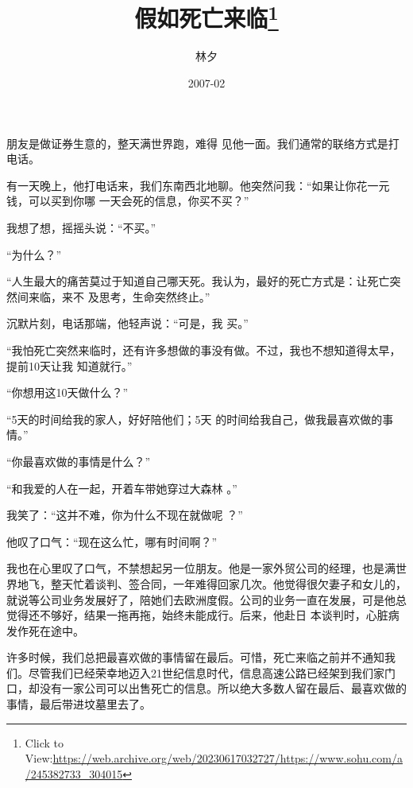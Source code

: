 \documentclass{article}
\title{假如死亡来临\footnote{Click to View:\url{https://web.archive.org/web/20230617032727/https://www.sohu.com/a/245382733_304015}}}
\author{林夕}
\date{2007-02}
\begin{document}

\maketitle


\Large

﻿朋友是做证券生意的，整天满世界跑，难得
见他一面。我们通常的联络方式是打电话。 

有一天晚上，他打电话来，我们东南西北地聊。他突然问我：“如果让你花一元钱，可以买到你哪
一天会死的信息，你买不买？” 


我想了想，摇摇头说：“不买。” 


“为什么？” 

“人生最大的痛苦莫过于知道自己哪天死。我认为，最好的死亡方式是：让死亡突然间来临，来不
及思考，生命突然终止。” 

\newpage

沉默片刻，电话那端，他轻声说：“可是，我
买。” 


“我怕死亡突然来临时，还有许多想做的事没有做。不过，我也不想知道得太早，提前10天让我
知道就行。” 


“你想用这10天做什么？” 

“5天的时间给我的家人，好好陪他们；5天
的时间给我自己，做我最喜欢做的事情。” 


“你最喜欢做的事情是什么？” 

“和我爱的人在一起，开着车带她穿过大森林
。” 

我笑了：“这并不难，你为什么不现在就做呢
？” 

\newpage

他叹了口气：“现在这么忙，哪有时间啊？”
 

我也在心里叹了口气，不禁想起另一位朋友。他是一家外贸公司的经理，也是满世界地飞，整天忙着谈判、签合同，一年难得回家几次。他觉得很欠妻子和女儿的，就说等公司业务发展好了，陪她们去欧洲度假。公司的业务一直在发展，可是他总觉得还不够好，结果一拖再拖，始终未能成行。后来，他赴日
本谈判时，心脏病发作死在途中。 

许多时候，我们总把最喜欢做的事情留在最后。可惜，死亡来临之前并不通知我们。尽管我们已经荣幸地迈入21世纪信息时代，信息高速公路已经架到我们家门口，却没有一家公司可以出售死亡的信息。所以绝大多数人留在最后、最喜欢做的事情，最后带进坟墓里去了。
\end{document}
